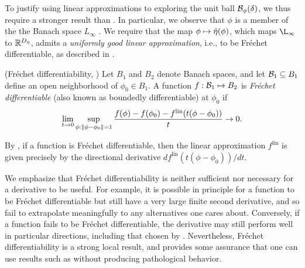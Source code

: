 To justify using linear approximations to exploring the unit ball
$\mathcal{B}_\phi(\delta)$, we thus require a stronger result than
.  In particular, we observe that $\phi$ is a member
of the the Banach space $L_\infty$ \citep[Theorem 5.2.1]{dudley:2018:real}. We
require that the map $\phi \mapsto \hat\eta(\phi)$, which maps $\L_\infty$ to
$\mathbb{R}^{D_{\eta}}$, admits a {\em uniformly good linear approximation}, i.e.,
to be Fr{\'e}chet differentiable, as described in .

\begin{defn}
    (Fr{\'e}chet differentiability,
    \citep[Definition 4.5]{zeidler:2013:functional})
%
Let $B_1$ and $B_2$ denote Banach spaces, and let $\mathcal{B}_1 \subseteq B_1$ define
an open neighborhood of $\phi_0 \in B_1$.
%
A function $f: \mathcal{B}_1 \mapsto B_2$ is {\em Fr{\'echet} differentiable} (also
known as boundedly differentiable) at $\phi_0$ if
%
\begin{align*}
%
\lim_{t \rightarrow 0}
    \sup_{\phi: \norm{\phi - \phi_0} = 1}
    \frac{f(\phi) - f(\phi_0) -
          f^{\mathrm{lin}}(t (\phi - \phi_0))
         }{t} \rightarrow 0.
%
\end{align*}
%
\end{defn}

By \citep[Proposition 4.8]{zeidler:2013:functional}, if a function is
Fr{\'e}chet differentiable, then the linear approximation $f^{\mathrm{lin}}$ is
given precisely by the directional derivative $d f^{\mathrm{lin}}(t (\phi -
\phi_0)) / d t$.

We emphasize that Fr{\'e}chet differentiability is neither sufficient nor
necessary for a derivative to be useful.  For example, it is possible in
principle for a function to be Fr{\'e}chet differentiable but still have a very
large finite second derivative, and so fail to extrapolate meaningfully to any
alternatives one cares about.  Conversely, if a function fails to be Fr{\'e}chet
differentiable, the derivative may still perform well in particular directions,
including that chosen by .  Nevertheless, Fr{\'e}chet
differentiability is a strong local result, and provides some assurance that one
can use results such as  without producing
pathological behavior.

